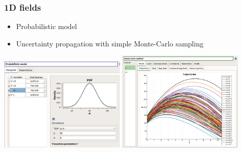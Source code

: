 \documentclass{beamer}
\begin{document}

\begin{frame}
\frametitle{1D fields}
	
\begin{itemize}
\item Probabilistic model
\item Uncertainty propagation with simple Monte-Carlo sampling
\end{itemize}

\begin{center}
\includegraphics[width=0.45\textwidth]{figures/persalys-field-probabilistic-model.png}
\includegraphics[width=0.45\textwidth]{figures/persalys-field-montecarlo-trajectories-extract.png}
\end{center}

\end{frame}

\end{document}
